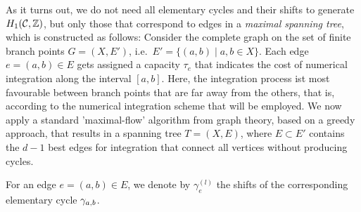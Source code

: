 \documentclass[main.tex]{subfiles}
\begin{document}
  \bigskip

  As it turns out, we do not need all elementary cycles and their shifts to generate $H_1(\mathcal{C},\mathbb{Z})$, but only those that correspond to edges in a \emph{maximal spanning tree}, which is constructed
  as follows: \abstand
   Consider the complete graph on the set of finite branch points $G = (X,E')$, i.e.\ $E' = \{  (a,b)  \mid  a,b \in X \}$.
   Each edge $e = (a,b) \in E$ gets assigned a capacity $\tau_e$ that indicates the cost of numerical integration along the interval $[a,b]$. \abstand
   Here, the integration process ist most favourable
   between branch points that are far away from the others, that is, according to the
   numerical integration scheme that will be employed. \abstand
   We now apply a standard 'maximal-flow' algorithm from graph theory, based on a greedy approach, that results in a spanning tree $T = (X,E)$, where $E \subset E'$ contains the $d-1$ best edges
   for integration that connect all vertices without producing cycles.

   \bigskip

  For an edge $e = (a,b) \in E$, we denote by $\gamma_e^{(l)}$ the shifts of the corresponding elementary cycle $\gamma_{a,b}$.
\end{document}
